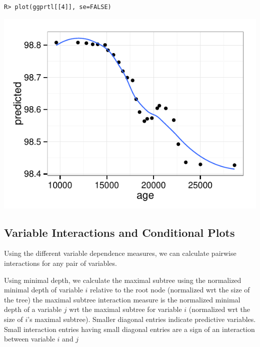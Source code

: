 \documentclass[nojss,letterpaper]{jss}\usepackage[]{graphicx}\usepackage[]{color}
\makeatletter
\def\maxwidth{ %
  \ifdim\Gin@nat@width>\linewidth
    \linewidth
  \else
    \Gin@nat@width
  \fi
}
\newenvironment{kframe}{%
 \def\at@end@of@kframe{}%
 \ifinner\ifhmode%
  \def\at@end@of@kframe{\end{minipage}}%
  \begin{minipage}{\columnwidth}%
 \fi\fi%
 \def\FrameCommand##1{\hskip\@totalleftmargin \hskip-\fboxsep
 \colorbox{shadecolor}{##1}\hskip-\fboxsep
     \hskip-\linewidth \hskip-\@totalleftmargin \hskip\columnwidth}%
 \MakeFramed {\advance\hsize-\width
   \@totalleftmargin\z@ \linewidth\hsize
   \@setminipage}}%
 {\par\unskip\endMakeFramed%
 \at@end@of@kframe}
\newenvironment{knitrout}{}{} %
\makeatother
\begin{document}
\begin{knitrout}\footnotesize
{}\color{fgcolor}\begin{kframe}
\begin{verbatim}
R> plot(ggprtl[[4]], se=FALSE)
\end{verbatim}
\end{kframe}

{\centering \includegraphics[width=\maxwidth]{figure/vig-pbc-partial-albumin-1} 

}



\end{knitrout}



\subsection{Variable Interactions and Conditional Plots}\label{S:interactions}
Using the different variable dependence measures, we can calculate pairwise interactions for any pair of variables. 

Using minimal depth, we calculate the maximal subtree using the normalized minimal depth of variable $i$ relative to the root node (normalized wrt the size of the tree) the maximal subtree interaction measure  is the normalized minimal depth of a variable $j$ wrt the maximal subtree for variable $i$ (normalized wrt the size of $i$'s maximal subtree). Smaller diagonal entries indicate predictive variables. Small interaction entries having small diagonal entries are a sign of an interaction between variable $i$ and $j$~\citep{Ishwaran_HighDimension:2010,Ishwaran_HighDimension:2011} 
\end{document}
